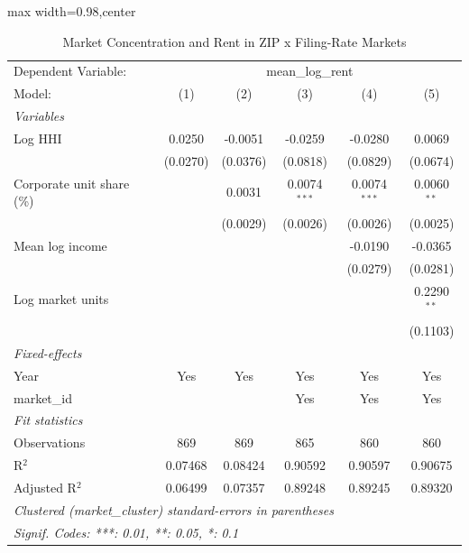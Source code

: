 
\begin{table}[htbp]
   \caption{\label{tab:market_concentration_rent} Market Concentration and Rent in ZIP x Filing-Rate Markets}
   \centering
   \scriptsize
   \begin{adjustbox}{max width=0.98\textwidth,center}
      \begin{tabular}{lccccc}
         \tabularnewline \midrule \midrule
         Dependent Variable: & \multicolumn{5}{c}{mean\_log\_rent}\\
         Model:                     & (1)      & (2)      & (3)            & (4)            & (5)\\  
         \midrule
         \emph{Variables}\\
         Log HHI                    & 0.0250   & -0.0051  & -0.0259        & -0.0280        & 0.0069\\   
                                    & (0.0270) & (0.0376) & (0.0818)       & (0.0829)       & (0.0674)\\   
         Corporate unit share (\%)  &          & 0.0031   & 0.0074$^{***}$ & 0.0074$^{***}$ & 0.0060$^{**}$\\   
                                    &          & (0.0029) & (0.0026)       & (0.0026)       & (0.0025)\\   
         Mean log income            &          &          &                & -0.0190        & -0.0365\\   
                                    &          &          &                & (0.0279)       & (0.0281)\\   
         Log market units           &          &          &                &                & 0.2290$^{**}$\\   
                                    &          &          &                &                & (0.1103)\\   
         \midrule
         \emph{Fixed-effects}\\
         Year                       & Yes      & Yes      & Yes            & Yes            & Yes\\  
         market\_id                 &          &          & Yes            & Yes            & Yes\\  
         \midrule
         \emph{Fit statistics}\\
         Observations               & 869      & 869      & 865            & 860            & 860\\  
         R$^2$                      & 0.07468  & 0.08424  & 0.90592        & 0.90597        & 0.90675\\  
         Adjusted R$^2$             & 0.06499  & 0.07357  & 0.89248        & 0.89245        & 0.89320\\  
         \midrule \midrule
         \multicolumn{6}{l}{\emph{Clustered (market\_cluster) standard-errors in parentheses}}\\
         \multicolumn{6}{l}{\emph{Signif. Codes: ***: 0.01, **: 0.05, *: 0.1}}\\
      \end{tabular}
   \end{adjustbox}
\end{table}


